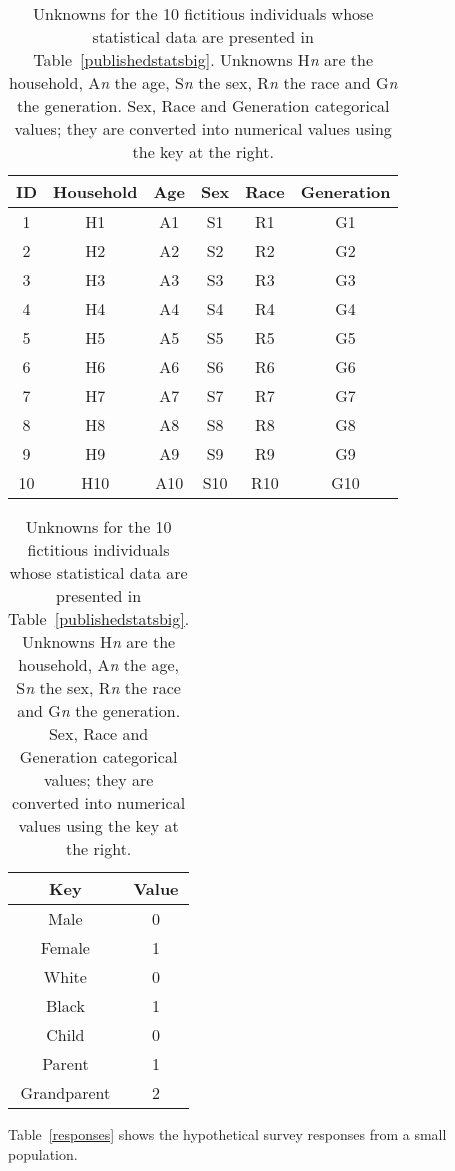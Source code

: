 \documentclass[runningheads]{llncs}
\begin{document}
\begin{table}
\begin{minipage}[t]{2in}
\begin{tabular}{cccccc}
ID & Household & Age & Sex & Race & Generation \\
\hline
\hline
1 & H1 & A1 & S1 & R1 & G1  \\
\hline
2 & H2 & A2 & S2 & R2 & G2  \\
\hline
3 & H3 & A3 & S3 & R3 & G3  \\
\hline
4 & H4 & A4 & S4 & R4 & G4  \\
\hline
5 & H5 & A5 & S5 & R5 & G5  \\
\hline
6 & H6 & A6 & S6 & R6 & G6  \\
\hline
7 & H7 & A7 & S7 & R7 & G7  \\
\hline
8 & H8 & A8 & S8 & R8 & G8  \\
\hline
9 & H9 & A9 & S9 & R9 & G9  \\
\hline
10 & H10 & A10 & S10 & R10 & G10  \\
\hline
\hline
\end{tabular}
\end{minipage}
\hspace{.5in}
\begin{minipage}[t]{1in}
\begin{tabular}{c|c}
Key & Value \\
\hline
Male & 0 \\
Female & 1 \\
\hline
White & 0 \\
Black & 1 \\
\hline
Child & 0 \\
Parent & 1 \\
Grandparent & 2 \\
\hline
\end{tabular}
\end{minipage}
\caption{Unknowns for the 10 fictitious individuals whose statistical
  data are presented in Table~\ref{publishedstatsbig}. Unknowns
  H\textit{n} are the household, A\textit{n} the age, S\textit{n} the
  sex, R\textit{n} the race and G\textit{n} the generation. Sex, Race
  and Generation categorical values; they are converted into numerical
  values using the key at the right.}\label{unknownssmall}
\end{table}



Table~\ref{responses}
shows the hypothetical survey responses from a small population.
\end{document}
